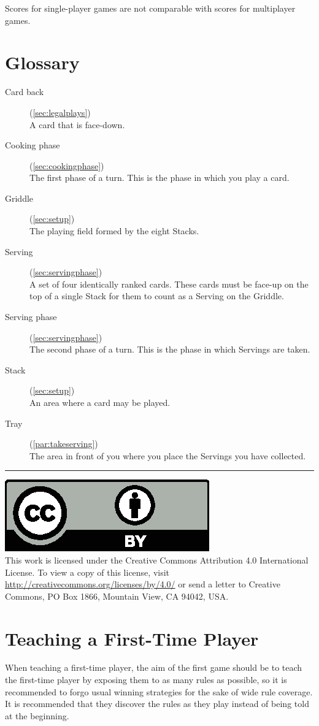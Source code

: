 \documentclass{article}
\newcommand\copyrightfooter{
  \medskip
  \hrule

  {
    \small
    \includegraphics[scale=0.5]{cc-by.eps}\\
    This work is licensed under the Creative Commons Attribution 4.0
    International License. To view a copy of this license, visit
    \url{http://creativecommons.org/licenses/by/4.0/} or send a letter to Creative Commons, PO Box 1866, Mountain View, CA 94042, USA.
  }
}
\begin{document}
Scores for single-player games are not comparable with scores for multiplayer games.

\pagebreak
\section{Glossary}
\label{sec:glossary}

\begin{description}
  \item[Card back] (\autoref{sec:legalplays})\\
    A card that is face-down.
  \item[Cooking phase] (\autoref{sec:cookingphase})\\
    The first phase of a turn. This is the phase in which you play a card.
  \item[Griddle] (\autoref{sec:setup})\\
    The playing field formed by the eight Stacks.
  \item[Serving] (\autoref{sec:servingphase})\\
    A set of four identically ranked cards. These cards must be face-up on the top of a single Stack for them to count as a Serving on the Griddle.
  \item[Serving phase] (\autoref{sec:servingphase})\\
    The second phase of a turn. This is the phase in which Servings are taken.
  \item[Stack] (\autoref{sec:setup})\\
    An area where a card may be played.
  \item[Tray] (\autoref{par:takeserving})\\
    The area in front of you where you place the Servings you have collected.
\end{description}

\copyrightfooter

\newpage
\appendix
\renewcommand{\thesection}{\Alph{section}}

\section{Teaching a First-Time Player}
\label{appendix:firsttime}

When teaching a first-time player, the aim of the first game should be to teach the first-time player by exposing them to as many rules as possible, so it is recommended to forgo usual winning strategies for the sake of wide rule coverage. It is recommended that they discover the rules as they play instead of being told at the beginning.
\end{document}
